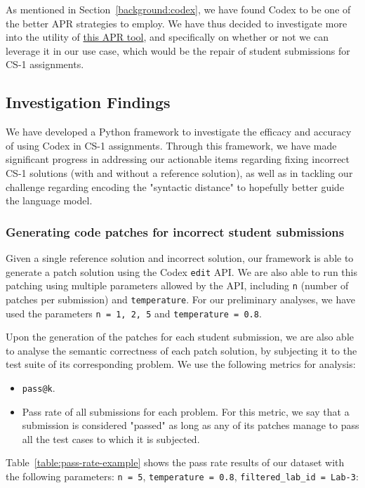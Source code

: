 As mentioned in Section~\ref{background:codex}, we have found Codex to be one of the better
APR strategies to employ.
We have thus decided to investigate more into the utility of
\href{https://openai.com/blog/openai-codex/}{this APR tool},
and specifically on whether or not we can leverage it in our use case, which would be the repair
of student submissions for CS-1 assignments.

\subsection{Investigation Findings}

We have developed a Python framework to investigate the efficacy and accuracy of using Codex in
CS-1 assignments.
Through this framework, we have made significant progress in addressing our actionable items regarding
fixing incorrect CS-1 solutions (with and without a reference solution), as well as in tackling our
challenge regarding encoding the "syntactic distance" to hopefully better guide the language model.

\subsubsection{Generating code patches for incorrect student submissions}

Given a single reference solution and incorrect solution, our framework is able to generate a patch
solution using the Codex \texttt{edit} API. We are also able to run this patching using multiple
parameters allowed by the API, including \texttt{n} (number of patches per submission) and
\texttt{temperature}.
For our preliminary analyses, we have used the parameters \texttt{n = 1, 2, 5} and
\texttt{temperature = 0.8}.

Upon the generation of the patches for each student submission, we are also able to analyse the
semantic correctness of each patch solution, by subjecting it to the test suite of its corresponding
problem.
We use the following metrics for analysis:
\begin{itemize}
    \item \texttt{pass@k}.
    \item Pass rate of all submissions for each problem.
          For this metric, we say that a submission is considered "passed" as long as any of its
          patches manage to pass all the test cases to which it is subjected.
\end{itemize}

Table~\ref{table:pass-rate-example} shows the pass rate results of our dataset with the following
parameters: \texttt{n = 5}, \texttt{temperature = 0.8}, \texttt{filtered\_lab\_id = Lab-3}:

